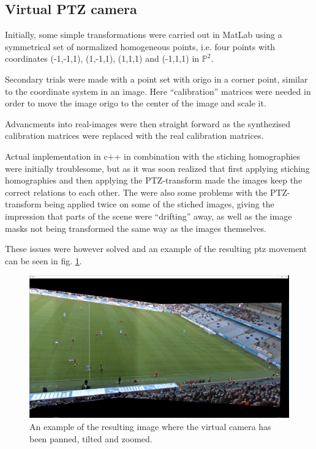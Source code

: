 \subsection{Virtual PTZ camera}
Initially, some simple transformations were carried out in MatLab using a symmetrical set of normalized homogeneous points, i.e. four points with coordinates (-1,-1,1), (1,-1,1), (1,1,1) and (-1,1,1) in $\mathbb{P}^2$.

Secondary trials were made with a point set with origo in a corner point, similar to the coordinate system in an image. Here ``calibration'' matrices were needed in order to move the image origo to the center of the image and scale it.

Advancments into real-images were then straight forward as the synthezised calibration matrices were replaced with the real calibration matrices.

Actual implementation in c++ in combination with the stiching homographies were initially troublesome, but as it was soon realized that first applying stiching homographies and then applying the PTZ-transform made the images keep the correct relations to each other. The were also some problems with the PTZ-transform being applied twice on some of the stiched images, giving the impression that parts of the scene were ``drifting'' away, as well as the image masks not being transformed the same way as the images themselves.

These issues were however solved and an example of the resulting ptz movement can be seen in fig. \ref{fig:ptz_res}.

\begin{figure}[H]
	\centering
	\includegraphics[width=0.8\columnwidth]{../results/images/PTZ_res.PNG}
	\caption{An example of the resulting image where the virtual camera has been panned, tilted and zoomed.}
	\label{fig:ptz_res}
\end{figure}
